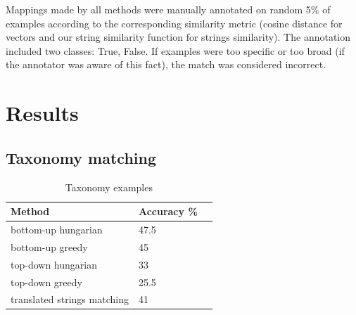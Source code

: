 \documentclass[11pt,a4paper]{article}
\begin{document}
Mappings made by all methods were manually annotated on random 5\% of examples according to the corresponding similarity metric (cosine distance for vectors and our string similarity function for strings similarity). The annotation included two classes: True, False. If examples were too specific or too broad (if the annotator was aware of this fact), the match was considered incorrect.
\section{Results}

\subsection{Taxonomy matching}
	\begin{table}[!htbp]
	\small
	\caption{Taxonomy examples}
	\label{table-taxonomies-results}		
	\centering
	\begin{tabular}{|l|l|l|}
	\hline
	{Method} & {Accuracy \%} \\ \hline
	bottom-up hungarian & 47.5 \\ \hline
	bottom-up greedy & 45 \\ \hline
	top-down hungarian & 33 \\ \hline
	top-down greedy & 25.5 \\ \hline
	translated strings matching & 41 \\
	\hline
	\end{tabular}
\end{table}
\end{document}
